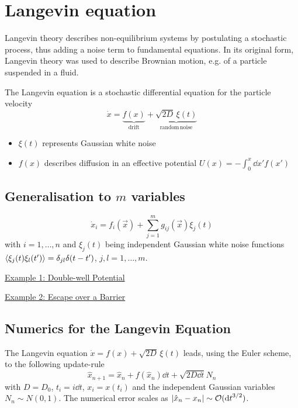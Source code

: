 \documentclass{notebook}
\begin{document}
\section{Langevin equation}


Langevin theory describes non-equilibrium systems by postulating a stochastic process, thus adding a noise term to fundamental equations. In its original form, Langevin theory was used to describe Brownian motion, e.g. of a particle suspended in a fluid.

\begin{theorem}
	The Langevin equation is a stochastic differential equation for the particle velocity
	\begin{equation}
	\dot{x} = \underbrace{f(x)}_{\mathrm{drift}} + \underbrace{\sqrt{2D} \, \xi(t)}_{\mathrm{random \, noise}}
	\label{langevin}
	\end{equation}
	\begin{itemize}
		\item $\xi(t)$ represents Gaussian white noise 
		\item{$f(x)$ describes diffusion in an effective potential $U(x) = - \int_0^{x}{\dd{x'} f(x')}$}
	\end{itemize}
\end{theorem}

\subsection*{Generalisation to $m$ variables}
%
\begin{equation}
\dot{x}_i =f_i(\vec x) + \sum_{j=1}^m g_{ij}(\vec x) \xi_j(t)
\end{equation}
%
with $i = 1, \dots, n$ and $\xi_j(t)$ being independent Gaussian white noise functions $\expval{\xi_j(t) \xi_l(t')} = \delta_{jl} \delta(t - t')$, $j, l = 1, \dots, m$.

\underline{Example 1: Double-well Potential}

\underline{Example 2: Escape over a Barrier}


\subsection*{Numerics for the Langevin Equation}

\begin{theorem}
	The Langevin equation $\dot{x} = f(x) + \sqrt{2D} \, \xi(t)$ leads, using the Euler scheme, to the following update-rule
	\begin{equation}
	\hat{x}_{n+1} = \hat{x}_n + f(\hat{x}_n) \dd{t} + \sqrt{2 D \dd{t}} N_n
	\end{equation}
	with $D = D_0$, $t_i = i \dd{t}$, $x_i = x(t_i)$ and the independent Gaussian variables $N_n \sim N(0,1)$. The numerical error scales as $|\hat{x}_n - x_n| \sim \mathcal{O}(\dd{t}^{3/2})$.
\end{theorem}
\end{document}

